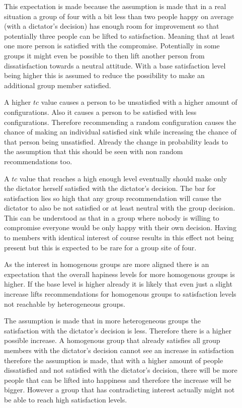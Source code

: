 \begin{description}
    \item[] This expectation is made because the assumption is made that in a real situation a group of four with a bit less than two people happy on average (with a dictator's decision) has enough room for improvement so that potentially three people can be lifted to satisfaction. Meaning that at least one more person is satisfied with the compromise. Potentially in some groups it might even be possible to then lift another person from dissatisfaction towards a neutral attitude. With a base satisfaction level being higher this is assumed to reduce the possibility to make an additional group member satisfied.
    \item[] A higher $tc$ value causes a person to be unsatisfied with a higher amount of configurations. Also it causes a person to be satisfied with less configurations. Therefore recommending a random configuration causes the chance of making an individual satisfied sink while increasing the chance of that person being unsatisfied. Already the change in probability leads to the assumption that this should be seen with non random recommendations too.
    \item[] A $tc$ value that reaches a high enough level eventually should make only the dictator herself satisfied with the dictator's decision. The bar for satisfaction lies so high that any group recommendation will cause the dictator to also be not satisfied or at least neutral with the group decision. This can be understood as that in a group where nobody is willing to compromise everyone would be only happy with their own decision. Having to members with identical interest of course results in this effect not being present but this is expected to be rare for a group site of four. 
    \item[] As the interest in homogenous groups are more aligned there is an expectation that the overall hapiness levels for more homogenous groups is higher. If the base level is higher already it is likely that even just a slight increase lifts recommendations for homogenous groups to satisfaction levels not reachable by heterogeneous groups.
    \item[] The assumption is made that in more heterogeneous groups the satisfaction with the dictator's decision is less. Therefore there is a higher possible increase. A homogenous group that already satisfies all group members with the dictator's decision cannot see an increase in satisfaction therefore the assumption is made, that with a higher amount of people dissatisfied and not satisfied with the dictator's decision, there will be more people that can be lifted into happiness and therefore the increase will be bigger. However a group that has contradicting interest actually might not be able to reach high satisfaction levels.

\end{description}

